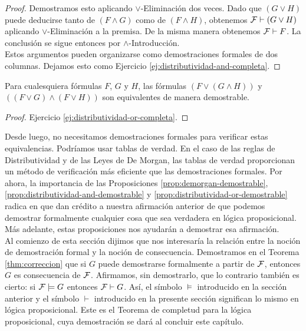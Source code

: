 \documentclass[12pt,a4paper]{book}
\begin{document}
\begin{proof}
        Demostramos esto aplicando $\vee$-Eliminación dos veces. Dado que $(G\vee H)$ puede deducirse tanto de $(F\wedge G)$
        como de $(F\wedge H)$, obtenemos $\mathcal{F}\vdash(G\vee H)$ aplicando $\vee$-Eliminación a la premisa. De la misma manera
        obtenemos $\mathcal{F}\vdash F$. La conclusión se sigue entonces por $\wedge$-Introducción.\\
        Estos argumentos pueden organizarse como demostraciones formales de dos columnas. Dejamos esto como
        Ejercicio \ref{ej:distributividad-and-completa}.
    \end{proof}

    \begin{proposicion}\label{prop:distributividad-or-demostrable}
        Para cualesquiera fórmulas $F$, $G$ y $H$, las fórmulas $(F\vee(G\wedge H))$ y $((F\vee G)\wedge(F\vee H))$ son
        equivalentes de manera demostrable.
    \end{proposicion}
    \begin{proof}
        Ejercicio \ref{ej:distributividad-or-completa}.
    \end{proof}

    Desde luego, no necesitamos demostraciones formales para verificar estas equivalencias. Podríamos usar tablas de verdad. En
    el caso de las reglas de Distributividad y de las Leyes de De Morgan, las tablas de verdad proporcionan un método de
    verificación más eficiente que las demostraciones formales. Por ahora, la importancia de las Proposiciones
    \ref{prop:demorgan-demostrable}, \ref{prop:distributividad-and-demostrable} y \ref{prop:distributividad-or-demostrable}
    radica en que dan crédito a nuestra afirmación anterior de que podemos demostrar formalmente cualquier cosa que sea
    verdadera en lógica proposicional. Más adelante, estas proposiciones nos ayudarán a demostrar esa afirmación.\\
    Al comienzo de esta sección dijimos que nos interesaría la relación entre la noción de demostración formal y la noción de
    consecuencia. Demostramos en el Teorema \ref{thm:correccion} que si $G$ puede demostrarse formalmente a partir de $\mathcal{F}$,
    entonces $G$ es consecuencia de $\mathcal{F}$. Afirmamos, sin demostrarlo, que lo contrario también es cierto: si
    $\mathcal{F}\models G$ entonces $\mathcal{F}\vdash G$. Así, el símbolo $\models$ introducido en la sección anterior y el símbolo $\vdash$
    introducido en la presente sección significan lo mismo en lógica proposicional. Este es el Teorema de completud para la
    lógica proposicional, cuya demostración se dará al concluir este capítulo.
\end{document}
